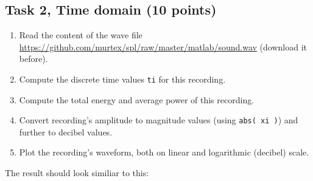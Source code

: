 \subsection*{Task 2, Time domain \textnormal{(10 points)}}
\begin{enumerate}
	\item Read the content of the wave file \url{https://github.com/murtex/spl/raw/master/matlab/sound.wav} (download it before).
	\item Compute the discrete time values \texttt{ti} for this recording.
	\item Compute the total energy and average power of this recording.
	\item Convert recording's amplitude to magnitude values (using \texttt{abs( xi )}) and further to decibel values.
	\item Plot the recording's waveform, both on linear and logarithmic (decibel) scale.
\end{enumerate}

The result should look similiar to this:
\begin{figure}[!h]
	\centering
	\begin{subfigure}[c]{0.48\linewidth}
	\end{subfigure}
	\hspace{0.01\linewidth}
	\begin{subfigure}[c]{0.48\linewidth}
	\end{subfigure}
\end{figure}

